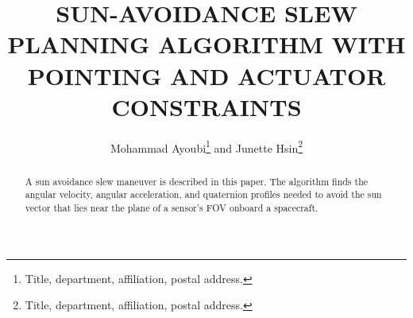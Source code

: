 \documentclass[letterpaper, preprint, paper,11pt]{AAS}	%
\begin{document}
\title{SUN-AVOIDANCE SLEW PLANNING ALGORITHM WITH POINTING AND ACTUATOR CONSTRAINTS}

\author{
	Mohammad Ayoubi\thanks{Title, department, affiliation, postal address.} and Junette Hsin\thanks{Title, department, affiliation, postal address.}
}


\maketitle{} 		


\begin{abstract}
	
	A sun avoidance slew maneuver is described in this paper. The algorithm finds the angular velocity, angular acceleration, and quaternion profiles needed to avoid the sun vector that lies near the plane of a sensor's FOV onboard a spacecraft. 
	

\end{abstract}
\end{document}
